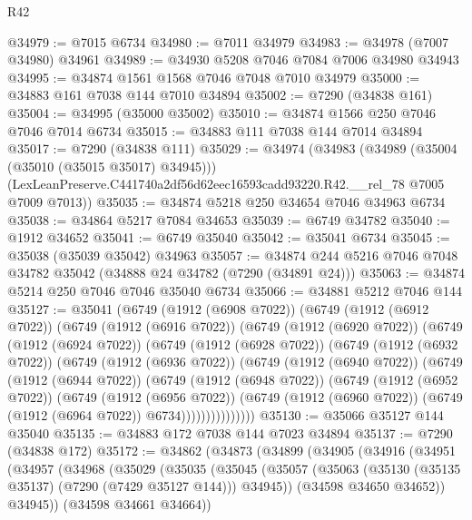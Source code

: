 \begin{lexlean}{R42}
\begin{coremodule}
{@34979 := @7015 @6734
@34980 := @7011 @34979
@34983 := @34978 (@7007 @34980) @34961
@34989 := @34930 @5208 @7046 @7084 @7006 @34980 @34943
@34995 := @34874 @1561 @1568 @7046 @7048 @7010 @34979
@35000 := @34883 @161 @7038 @144 @7010 @34894
@35002 := @7290 (@34838 @161)
@35004 := @34995 (@35000 @35002)
@35010 := @34874 @1566 @250 @7046 @7046 @7014 @6734
@35015 := @34883 @111 @7038 @144 @7014 @34894
@35017 := @7290 (@34838 @111)
@35029 := @34974
    (@34983
      (@34989 (@35004 (@35010 (@35015 @35017) @34945)))
      (LexLeanPreserve.C441740a2df56d62eec16593cadd93220.R42.__rel_78 @7005 @7009 @7013))
@35035 := @34874 @5218 @250 @34654 @7046 @34963 @6734
@35038 := @34864 @5217 @7084 @34653
@35039 := @6749 @34782
@35040 := @1912 @34652
@35041 := @6749 @35040
@35042 := @35041 @6734
@35045 := @35038 (@35039 @35042) @34963
@35057 := @34874 @244 @5216 @7046 @7048 @34782 @35042 (@34888 @24 @34782 (@7290 (@34891 @24)))
@35063 := @34874 @5214 @250 @7046 @7046 @35040 @6734
@35066 := @34881 @5212 @7046 @144
@35127 := @35041
    (@6749
      (@1912 (@6908 @7022))
      (@6749
        (@1912 (@6912 @7022))
        (@6749
          (@1912 (@6916 @7022))
          (@6749
            (@1912 (@6920 @7022))
            (@6749
              (@1912 (@6924 @7022))
              (@6749
                (@1912 (@6928 @7022))
                (@6749
                  (@1912 (@6932 @7022))
                  (@6749
                    (@1912 (@6936 @7022))
                    (@6749
                      (@1912 (@6940 @7022))
                      (@6749
                        (@1912 (@6944 @7022))
                        (@6749
                          (@1912 (@6948 @7022))
                          (@6749
                            (@1912 (@6952 @7022))
                            (@6749
                              (@1912 (@6956 @7022))
                              (@6749
                                (@1912 (@6960 @7022))
                                (@6749 (@1912 (@6964 @7022)) @6734)))))))))))))))
@35130 := @35066 @35127 @144 @35040
@35135 := @34883 @172 @7038 @144 @7023 @34894
@35137 := @7290 (@34838 @172)
@35172 := @34862
    (@34873
      (@34899
        (@34905
          (@34916
            (@34951
              (@34957
                (@34968
                  (@35029
                    (@35035
                      (@35045
                        (@35057
                          (@35063 (@35130 (@35135 @35137) (@7290 (@7429 @35127 @144))) @34945))
                        (@34598 @34650 @34652))
                      @34945))
                  (@34598 @34661 @34664))
}
\end{coremodule}
\end{lexlean}
